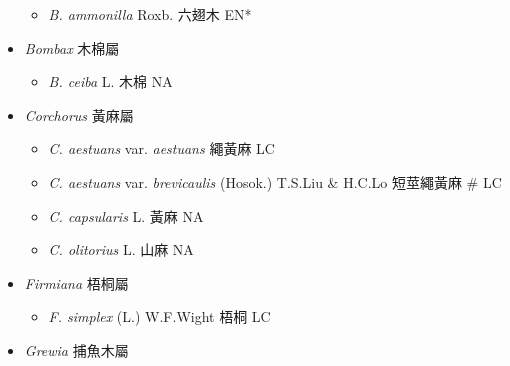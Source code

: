 \begin{itemize}
  \begin{itemize}
        \item[] \textit{B. ammonilla} Roxb.  六翅木   EN*
  \end{itemize}
 \item[] \textit{Bombax} 木棉屬
                                
  \begin{itemize}
        \item[] \textit{B. ceiba} L.  木棉   NA
  \end{itemize}
 \item[] \textit{Corchorus} 黃麻屬
                                
  \begin{itemize}
        \item[] \textit{C. aestuans} var. \textit{aestuans}   繩黃麻   LC
        \item[] \textit{C. aestuans} var. \textit{brevicaulis} (Hosok.) T.S.Liu \& H.C.Lo  短莖繩黃麻  \# LC
        \item[] \textit{C. capsularis} L.  黃麻   NA
        \item[] \textit{C. olitorius} L.  山麻   NA
  \end{itemize}
 \item[] \textit{Firmiana} 梧桐屬
                                
  \begin{itemize}
        \item[] \textit{F. simplex} (L.) W.F.Wight  梧桐   LC
  \end{itemize}
 \item[] \textit{Grewia} 捕魚木屬
                                

\end{itemize}
